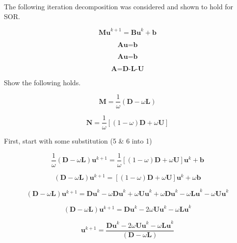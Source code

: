 \documentclass[12pt]{article}
\begin{document}
	The following iteration decomposition was considered and shown to hold for SOR.
	
	\begin{equation}
		\textbf{Mu}^{k+1} = \textbf{Bu}^k + \textbf{b}
	\end{equation}
	
	\begin{equation}
	\textbf{Au}=\textbf{b}
	\end{equation}
	
	\begin{equation}
	\textbf{Au}=\textbf{b}
	\end{equation}
	
	\begin{equation}
	\textbf{A}=\textbf{D-L-U}
	\end{equation}
	
	\noindent Show the following holds.
	
	\begin{equation}
	\textbf{M}=\frac{1}{\omega}(\textbf{D}-\omega\textbf{L})
	\end{equation}
	
	\begin{equation}
	\textbf{N} = \frac{1}{\omega}[(1-\omega)\textbf{D} + \omega\textbf{U}]
	\end{equation}

\noindent First, start with some substitution (5 \& 6 into 1)

\begin{equation}
\frac{1}{\omega}(\textbf{D}-\omega\textbf{L})\textbf{u}^{k+1} = \frac{1}{\omega}[(1-\omega)\textbf{D} + \omega\textbf{U}]\textbf{u}^k + \textbf{b}
\end{equation}

\begin{equation}
(\textbf{D}-\omega\textbf{L})\textbf{u}^{k+1} = [(1-\omega)\textbf{D} + \omega\textbf{U}]\textbf{u}^k + \omega \textbf{b}
\end{equation}

\begin{equation}
(\textbf{D}-\omega\textbf{L})\textbf{u}^{k+1} = \textbf{Du}^k - \omega\textbf{Du}^k + \omega\textbf{Uu}^k + \omega \textbf{Du}^k - \omega\textbf{Lu}^k - \omega \textbf{Uu}^k
\end{equation}

\begin{equation}
(\textbf{D}-\omega\textbf{L})\textbf{u}^{k+1} = \textbf{Du}^k - 2\omega \textbf{Uu}^k - \omega \textbf{Lu}^k
\end{equation}

\begin{equation}
\textbf{u}^{k+1} = \frac{\textbf{Du}^k - 2\omega \textbf{Uu}^k - \omega \textbf{Lu}^k}{(\textbf{D}-\omega\textbf{L})}
\end{equation}





		
	
	
	
	
\end{document}
